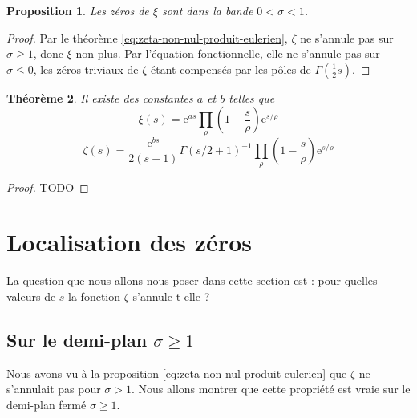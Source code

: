 \documentclass[french]{report}
\newtheorem{theorem}{Théorème}[section]
\newtheorem{proposition}[theorem]{Proposition}
\begin{document}
\begin{proposition}
  Les zéros de $\xi$ sont dans la bande $0<\sigma<1$.
\end{proposition}

\begin{proof}
  Par le théorème \ref{eq:zeta-non-nul-produit-eulerien}, $\zeta$ ne s'annule pas sur $\sigma\geq1$, donc $\xi$ non plus. Par l'équation fonctionnelle, elle ne s'annule pas sur $\sigma\leq0$, les zéros triviaux de $\zeta$ étant compensés par les pôles de $\Gamma(\frac{1}{2}s)$.
\end{proof}

\begin{theorem}\label{thm:produit-hadamard}
  Il existe des constantes $a$ et $b$ telles que
  \[ \xi(s)=\mathrm{e}^{as}\prod_{\rho}\left(1-\frac{s}{\rho}\right)\mathrm{e}^{s/\rho} \]
  \[ \zeta(s)=\frac{\mathrm{e}^{bs}}{2(s-1)}\Gamma(s/2+1)^{-1}\prod_{\rho}\left(1-\frac{s}{\rho}\right)\mathrm{e}^{s/\rho} \]
\end{theorem}

\begin{proof}
  TODO
\end{proof}

\section{Localisation des zéros}\label{section:localisation-zeros}

La question que nous allons nous poser dans cette section est : pour quelles valeurs de $s$ la fonction $\zeta$ s'annule-t-elle ?

\subsection{Sur le demi-plan $\sigma\geq 1$}

Nous avons vu à la proposition \ref{eq:zeta-non-nul-produit-eulerien} que $\zeta$ ne s'annulait pas pour $\sigma>1$. Nous allons montrer que cette propriété est vraie sur le demi-plan fermé $\sigma\geq1$.
\end{document}
